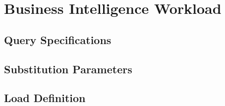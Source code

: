 \chapter{Business Intelligence Workload}

\section{Query Specifications}



























\section{Substitution Parameters}


\section{Load Definition}

